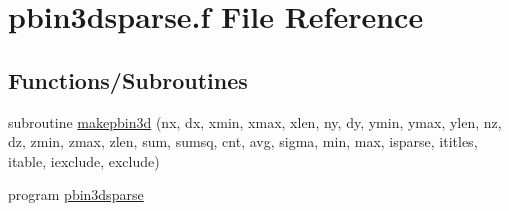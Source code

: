 \hypertarget{pbin3dsparse_8f}{\section{pbin3dsparse.\-f File Reference}
\label{pbin3dsparse_8f}
}
\subsection*{Functions/\-Subroutines}
\begin{DoxyCompactItemize}
\item 
subroutine \hyperlink{pbin3dsparse_8f_ae964060ba8c0ad02bbeb834f221adefe}{makepbin3d} (nx, dx, xmin, xmax, xlen, ny, dy, ymin, ymax, ylen, nz, dz, zmin, zmax, zlen, sum, sumsq, cnt, avg, sigma, min, max, isparse, ititles, itable, iexclude, exclude)
\item 
program \hyperlink{pbin3dsparse_8f_a50082583553ca380fb1e4d140a444762}{pbin3dsparse}
\end{DoxyCompactItemize}



